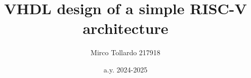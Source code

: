 \usepackage[a4paper, left=1in, right=1in, bottom=1in, top=0.75in]{geometry}
\usepackage[utf8]{inputenc} %
\usepackage[T1]{fontenc}
\usepackage{amssymb}
\usepackage{newtxtext}
\usepackage{multicol}
\usepackage{minted}
\usepackage{graphicx}
\usepackage[italicdiff]{physics}
\usepackage{float}
\usepackage{amsmath}
\usepackage{titlepic}
\usepackage{titlesec}
\usepackage{hyperref}
\usepackage{pgfplots}
\usepackage{multirow}
\pgfplotsset{compat=1.18}

\graphicspath{{images/}}
\setcounter{secnumdepth}{0}

\titleformat{\chapter}[display]
  {\normalfont\bfseries}{}{0pt}{\Huge}
  
\title{VHDL design of a simple RISC-V architecture}
\author{Mirco Tollardo 217918}
\date{a.y. 2024-2025}
